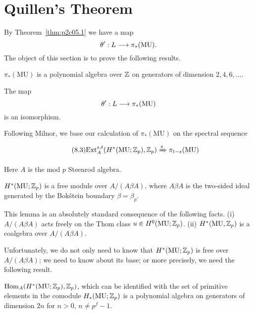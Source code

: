 \documentclass[../main]{subfiles}
\begin{document}
\label{sec:p2c8}

\chapter{Quillen's Theorem}
By Theorem~\ref{thm:p2c05.1} we have a map $$\theta' : L \overset{}{\longrightarrow} \pi_\ast(\mathrm{MU}).$$ The object of this section is to prove the following results. 

\begin{theorem}[Milnor]
\label{thm:p2c08.1}
$\pi_\ast(\mathrm{MU})$ is a polynomial algebra over $\mathbb{Z}$ on generators of dimension $2, 4, 6, \ldots$. 
\end{theorem}

\begin{theorem}[Quillen]
\label{thm:p2c08.2}
The map $$\theta' : L \overset{}{\longrightarrow} \pi_\ast(\mathrm{MU})$$ is an isomorphism.
\end{theorem}

Following Milnor, we base our calculation of $\pi_\ast(\mathrm{MU})$ on the spectral sequence

\begin{equation}
\tag{8.3}
\label{eqn:p2c08.3}
\mathrm{Ext}_A^{s, t} (H^\ast(\mathrm{MU}; \mathbb{Z}_p), \mathbb{Z}_p) \xRightarrow{s} \pi_{t - s}(\mathrm{MU})
\end{equation}

Here $A$ is the mod $p$ Steenrod algebra.

\begin{lemma}
\label{lem:p2c08.4}
$H^\ast(\mathrm{MU}; \mathbb{Z}_p)$ is a free module over $A/(A \beta A)$, where $A \beta A$ is the two-sided ideal generated by the Bokštein boundary $\beta = \beta_p$. 
\end{lemma}

This lemma is an absolutely standard consequence of the following facts. (i) $A/(A \beta A)$ acts freely on the Thom class $u \in H^0(\mathrm {MU}; \mathbb{Z}_p)$. (ii) $H^\ast(\mathrm{MU}, \mathbb{Z}_p)$ is a coalgebra over $A/(A \beta A)$.

Unfortunately, we do not only need to know that $H^\ast(\mathrm{MU}; \mathbb{Z}_p)$ is free over $A/(A \beta A)$; we need to know about its base; or more precisely, we need the following result. 

\begin{lemma}
\label{lem:p2c08.5}
$\mathrm{Hom}_A(H^\ast(\mathrm{MU}; \mathbb{Z}_p), \mathbb{Z}_p)$, which can be identified with the set of primitive elements in the comodule $H_\ast(\mathrm{MU}; \mathbb{Z}_p)$ is a polynomial algebra on generators of dimension $2n$ for $n > 0$, $n \ne p^f - 1$.
\end{lemma}
\end{document}
